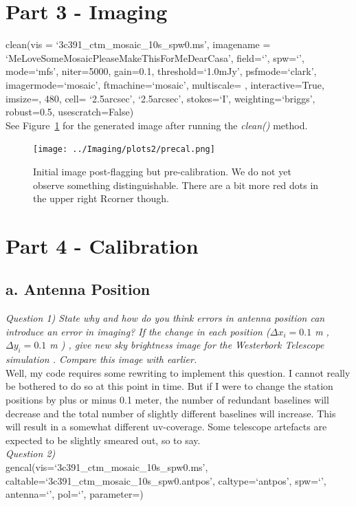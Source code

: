 \documentclass[12pt, a4paper]{article}
\begin{document}
\newpage

\section{Part 3 - Imaging}
clean(vis = `3c391\_ctm\_mosaic\_10s\_spw0.ms', imagename = `MeLoveSomeMosaicPleaseMakeThisForMeDearCasa', field=`', spw=`', mode=`mfs', niter=5000, gain=0.1, threshold=`1.0mJy', psfmode=`clark', imagermode=`mosaic', ftmachine=`mosaic', multiscale= \rbrack, interactive=True, imsize=, 480\rbrack, cell= \lbrack `2.5arcsec', `2.5arcsec'\rbrack, stokes=`I', weighting=`briggs', robust=0.5, usescratch=False) \\

\noindent See Figure~\ref{fig:part3} for the generated image after running the \emph{clean()} method.

\begin{figure}
    \centering
    \texttt{[image: ../Imaging/plots2/precal.png]}
    \caption{Initial image post-flagging but pre-calibration. We do not yet observe something distinguishable. There are a bit more red dots in the upper right Rcorner though. \label{fig:part3}}
\end{figure}

\section{Part 4 - Calibration}
\subsection{a. Antenna Position}
\noindent \textit{Question 1) State why and how do you think errors in antenna position can introduce an error in imaging? If the change in each position ($\Delta x_i = 0.1$ m , $\Delta y_i = 0.1$ m ) , give new sky brightness image for the Westerbork Telescope simulation . Compare this image with earlier. } \\
Well, my code requires some rewriting to implement this question. I cannot really be bothered to do so at this point in time. But if I were to change the station positions by plus or minus 0.1 meter, the number of redundant baselines will decrease and the total number of slightly different baselines will increase. This will result in a somewhat different uv-coverage. Some telescope artefacts are expected to be slightly smeared out, so to say. \\

\noindent \textit{Question 2) } \\
gencal(vis=`3c391\_ctm\_mosaic\_10s\_spw0.ms', caltable=`3c391\_ctm\_mosaic\_10s\_spw0.antpos', caltype=`antpos', spw=`', antenna=`', pol=`', parameter=\lbrack \rbrack) \\
\end{document}
